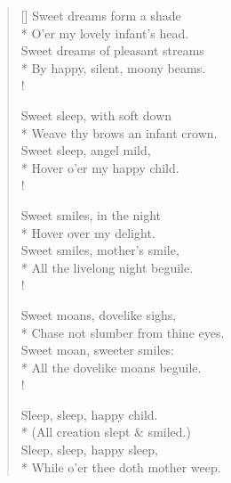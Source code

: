 \documentclass[MAIN]{subfiles}
\begin{document}
\settowidth{\versewidth}{Sweet dreams of pleasant streams}
\begin{verse}[\versewidth]
Sweet dreams form a shade\\*
O'er my lovely infant's head.\\
Sweet dreams of pleasant streams\\*
By happy, silent, moony beams.\\!

Sweet sleep, with soft down\\*
Weave thy brows an infant crown.\\
Sweet sleep, angel mild,\\*
Hover o'er my happy child.\\!

Sweet smiles, in the night\\*
Hover over my delight.\\
Sweet smiles, mother's smile,\\*
All the livelong night beguile.\\!

Sweet moans, dovelike sighs,\\*
Chase not slumber from thine eyes.\\
Sweet moan, sweeter smiles:\\*
All the dovelike moans beguile.\\!

Sleep, sleep, happy child.\\*
(All creation slept \& smiled.)\\
Sleep, sleep, happy sleep,\\*
While o'er thee doth mother weep.
\end{verse}
\end{document}
